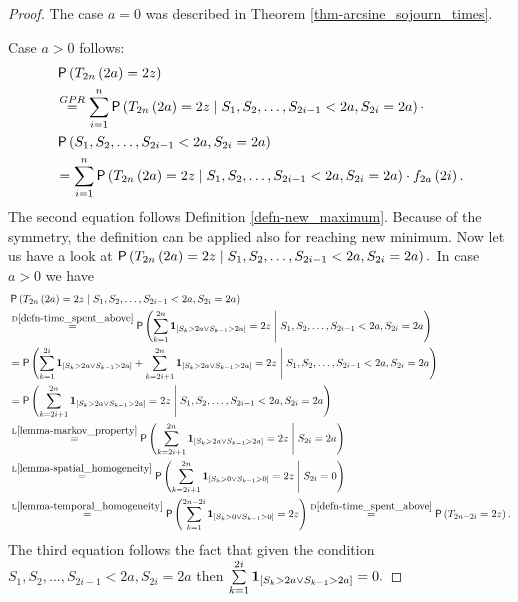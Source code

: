 \begin{proof}
  The case $a=0$ was described in Theorem \ref{thm-arcsine_sojourn_times}.

  Case $a>0$ follows:
  \[
    \begin{split}
      &\pr \left(T_{2n}\left(2a\right)=2z\right)\\
      &\gpr \suma \pr \left(T_{2n}\left(2a\right)=2z \Mid S_1,S_2, \ldots, S_{2i-1}<2a, S_{2i}=2a\right)\cdot\\
      & \pr\left(S_1,S_2, \ldots, S_{2i-1}<2a, S_{2i}=2a\right)\\
      &=\suma \pr\left(T_{2n}\left(2a\right)=2z \Mid S_1,S_2, \ldots, S_{2i-1}<2a, S_{2i}=2a\right)\cdot f_{2a}\left(2i\right).\\
    \end{split}
  \]
  The second equation follows Definition \ref{defn-new_maximum}. Because of the symmetry, the definition can be applied also for reaching new minimum.
  Now let us have a look at $\operatorname{\mathsf{P}} \left(T_{2n}\left(2a\right)=2z \;\middle\vert\; S_1,S_2, \ldots, S_{2i-1}<2a, S_{2i}=2a\right).$
  In case $a>0$ we have
  \[
    \begin{split}
        &\pr \left(T_{2n}\left(2a\right)=2z \Mid S_1,S_2, \ldots, S_{2i-1}<2a, S_{2i}=2a\right)\\
        &\overset{\text{D}\ref{defn-time_spent_above}}{=}\pr \left(\suma[k][1][2n] \indikator{S_k>2a \lor S_{k-1}>2a}=2z \Mid S_1,S_2, \ldots, S_{2i-1}<2a, S_{2i}=2a\right)\\
        &=\pr \left(\suma[k][1][2i] \indikator{S_k>2a \lor S_{k-1}>2a}+\suma[k][2i+1][2n] \indikator{S_k>2a \lor S_{k-1}>2a}=2z \Mid S_1,S_2, \ldots, S_{2i-1}<2a, S_{2i}=2a\right)\\
        &=\pr \left(\suma[k][2i+1][2n] \indikator{S_k>2a \lor S_{k-1}>2a}=2z \Mid S_1,S_2, \ldots, S_{2i-1}<2a, S_{2i}=2a\right)\\
        &\overset{\text{L}\ref{lemma-markov_property}}{=}\pr \left(\suma[k][2i+1][2n] \indikator{S_k>2a \lor S_{k-1}>2a}=2z \Mid S_{2i}=2a\right)\\
        &\overset{\text{L}\ref{lemma-spatial_homogeneity}}{=}\pr \left(\suma[k][2i+1][2n] \indikator{S_k>0 \lor S_{k-1}>0}=2z \Mid S_{2i}=0\right)\\
        &\overset{\text{L}\ref{lemma-temporal_homogeneity}}{=}\pr \left(\suma[k][1][2n-2i] \indikator{S_k>0 \lor S_{k-1}>0}=2z\right)
        \overset{\text{D}\ref{defn-time_spent_above}}{=}\pr \left(T_{2n-2i}=2z\right).\\
    \end{split}
  \]
  The third equation follows the fact that given the condition $S_1,S_2, \ldots, S_{2i-1}<2a, S_{2i}=2a$ then $\suma[k][1][2i] \indikator{S_k>2a \lor S_{k-1}>2a}=0.$


\end{proof}
